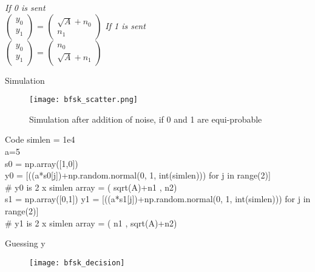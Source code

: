 \documentclass{beamer}
\begin{document}
\begin{frame}{}
    \textit{If 0 is sent} \\
    $\begin{pmatrix}
        y_0 \\
        y_1
    \end{pmatrix}$ =
    $\begin{pmatrix}
        \sqrt{A} + n_0 \\
        n_1
    \end{pmatrix}$
    \bigbreak
    \textit{If 1 is sent} \\
     $\begin{pmatrix}
        y_0 \\
        y_1
    \end{pmatrix}$ =
    $\begin{pmatrix}
        n_0 \\
        \sqrt{A} + n_1 
    \end{pmatrix}$
\end{frame}

\begin{frame}{Simulation}
    \begin{figure}
        \centering
        \texttt{[image: bfsk\_scatter.png]}
        \caption{Simulation after addition of noise, if 0 and 1 are equi-probable}
        \label{fig:my_label}
    \end{figure}
\end{frame}

\begin{frame}{Code}
    simlen = 1e4 \\
    a=5 \\
    \bigbreak
    s0 = np.array([1,0]) \\
    y0 = [((a*s0[j])+np.random.normal(0, 1, int(simlen))) for j in range(2)] \\
    \# y0 is 2 x simlen array = ( sqrt(A)+n1 , n2) \\
    \bigbreak
    s1 = np.array([0,1])
    y1 = [((a*s1[j])+np.random.normal(0, 1, int(simlen))) for j in range(2)] \\
    \# y1 is 2 x simlen array = ( n1 , sqrt(A)+n2)
\end{frame}

\begin{frame}{Guessing y}
    \begin{figure}{}
    \texttt{[image: bfsk\_decision]}
    \end{figure}
\end{frame}
\end{document}
